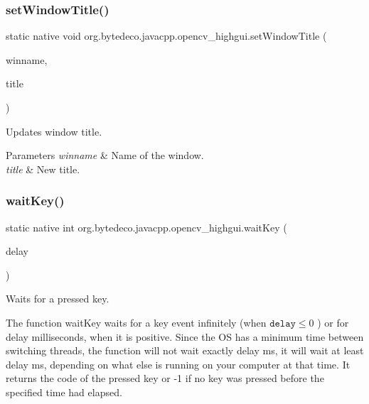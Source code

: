 \subsubsection{\texorpdfstring{set\+Window\+Title()}{setWindowTitle()}}
{\footnotesize\ttfamily static native void org.\+bytedeco.\+javacpp.\+opencv\+\_\+highgui.\+set\+Window\+Title (\begin{DoxyParamCaption}\item[{@Str Byte\+Pointer}]{winname,  }\item[{@Str Byte\+Pointer}]{title }\end{DoxyParamCaption})\hspace{0.3cm}{\ttfamily [static]}}



Updates window title. 


\begin{DoxyParams}{Parameters}
{\em winname} & Name of the window. \\
\hline
{\em title} & New title. \\
\hline
\end{DoxyParams}
\mbox{\label{group__highgui_gaf924607bac022bb3603e459e3f2f3239}} 
\subsubsection{\texorpdfstring{wait\+Key()}{waitKey()}}
{\footnotesize\ttfamily static native int org.\+bytedeco.\+javacpp.\+opencv\+\_\+highgui.\+wait\+Key (\begin{DoxyParamCaption}\item[{int}]{delay }\end{DoxyParamCaption})\hspace{0.3cm}{\ttfamily [static]}}



Waits for a pressed key. 

The function wait\+Key waits for a key event infinitely (when $\texttt{delay}\leq 0$ ) or for delay milliseconds, when it is positive. Since the OS has a minimum time between switching threads, the function will not wait exactly delay ms, it will wait at least delay ms, depending on what else is running on your computer at that time. It returns the code of the pressed key or -\/1 if no key was pressed before the specified time had elapsed. 

